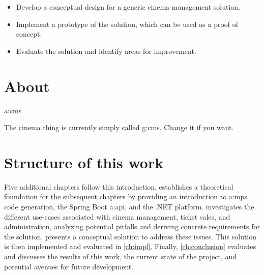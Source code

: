 \begin{itemize}
    \item Develop a conceptual design for a generic cinema management solution.
    \item Implement a prototype of the solution, which can be used as a proof of concept.
    \item Evaluate the solution and identify areas for improvement.
\end{itemize}

\section{About }

\gls{a:cms}


The cinema thing is currently simply called \gls{g:cms}. Change it if you want.

\section{Structure of this work}

Five additional chapters follow this introduction.  establishes a theoretical foundation for the subsequent chapters by providing an introduction to \gls{a:mps} code generation, the Spring Boot \gls{a:api}, and the .NET platform.  investigates the different use-cases associated with cinema management, ticket sales, and administration, analyzing potential pitfalls and deriving concrete requirements for the solution.  presents a conceptual solution to address these issues. This solution is then implemented and evaluated in \cref{ch:impl}. Finally, \cref{ch:conclusion} evaluates and discusses the results of this work, the current state of the project, and potential avenues for future development.